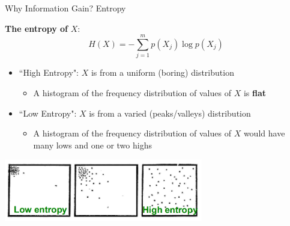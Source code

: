 \begin{frame}{Why Information Gain? Entropy}

\textbf{The entropy of} $X$: \\
\[
H(X) = - \sum_{j=1}^{m} p(X_j) \log p(X_j)
\]

\begin{itemize}
  \item ``High Entropy": $X$ is from a uniform (boring) distribution
  \begin{itemize}
    \item A histogram of the frequency distribution of values of $X$ is \textbf{flat}
  \end{itemize}

  \item ``Low Entropy": $X$ is from a varied (peaks/valleys) distribution
  \begin{itemize}
    \item A histogram of the frequency distribution of values of $X$ would have many lows and one or two highs
  \end{itemize}
\end{itemize}

\begin{center}
\includegraphics[width=0.65\textwidth]{images/decision-trees/decision-trees-11.png}
\end{center}

\end{frame}


